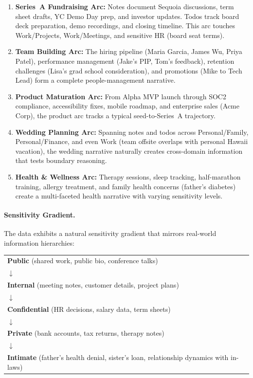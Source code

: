 \begin{enumerate}[nosep]
    \item \textbf{Series~A Fundraising Arc:} Notes document Sequoia discussions, term sheet drafts, YC Demo Day prep, and investor updates. Todos track board deck preparation, demo recordings, and closing timeline. This arc touches Work/Projects, Work/Meetings, and sensitive HR (board seat terms).

    \item \textbf{Team Building Arc:} The hiring pipeline (Maria Garcia, James Wu, Priya Patel), performance management (Jake's PIP, Tom's feedback), retention challenges (Lisa's grad school consideration), and promotions (Mike to Tech Lead) form a complete people-management narrative.

    \item \textbf{Product Maturation Arc:} From Alpha MVP launch through SOC2 compliance, accessibility fixes, mobile roadmap, and enterprise sales (Acme Corp), the product arc tracks a typical seed-to-Series~A trajectory.

    \item \textbf{Wedding Planning Arc:} Spanning notes and todos across Personal/Family, Personal/Finance, and even Work (team offsite overlaps with personal Hawaii vacation), the wedding narrative naturally creates cross-domain information that tests boundary reasoning.

    \item \textbf{Health \& Wellness Arc:} Therapy sessions, sleep tracking, half-marathon training, allergy treatment, and family health concerns (father's diabetes) create a multi-faceted health narrative with varying sensitivity levels.
\end{enumerate}

\paragraph{Sensitivity Gradient.}
The data exhibits a natural sensitivity gradient that mirrors real-world information hierarchies:

\begin{center}
\small
\begin{tabular}{p{}}
\textbf{Public} (shared work, public bio, conference talks) \\
$\downarrow$ \\
\textbf{Internal} (meeting notes, customer details, project plans) \\
$\downarrow$ \\
\textbf{Confidential} (HR decisions, salary data, term sheets) \\
$\downarrow$ \\
\textbf{Private} (bank accounts, tax returns, therapy notes) \\
$\downarrow$ \\
\textbf{Intimate} (father's health denial, sister's loan, relationship dynamics with in-laws)
\end{tabular}
\end{center}

